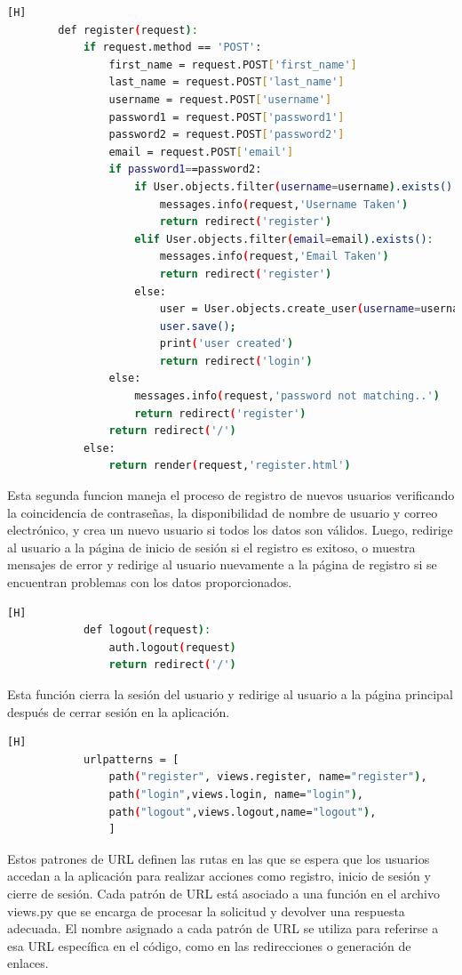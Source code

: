 \documentclass{article}
\begin{document}
	\begin{lstlisting}[language=bash,caption={Segunda funcion de views.py}][H]
        def register(request):
            if request.method == 'POST':
                first_name = request.POST['first_name']
                last_name = request.POST['last_name']
                username = request.POST['username']
                password1 = request.POST['password1']
                password2 = request.POST['password2']
                email = request.POST['email']
                if password1==password2:
                    if User.objects.filter(username=username).exists():
                        messages.info(request,'Username Taken')
                        return redirect('register')
                    elif User.objects.filter(email=email).exists():
                        messages.info(request,'Email Taken')
                        return redirect('register')
                    else:   
                        user = User.objects.create_user(username=username, password=password1, email=email,first_name=first_name,last_name=last_name)
                        user.save();
                        print('user created')
                        return redirect('login')
                else:
                    messages.info(request,'password not matching..')    
                    return redirect('register')
                return redirect('/')
            else:
                return render(request,'register.html')
	\end{lstlisting}
        Esta segunda funcion maneja el proceso de registro de nuevos usuarios verificando la coincidencia de contraseñas, la disponibilidad de nombre de usuario y correo electrónico, y crea un nuevo usuario si todos los datos son válidos. Luego, redirige al usuario a la página de inicio de sesión si el registro es exitoso, o muestra mensajes de error y redirige al usuario nuevamente a la página de registro si se encuentran problemas con los datos proporcionados.
        \begin{lstlisting}[language=bash,caption={Tercera funcion de views.py}][H]
            def logout(request):
                auth.logout(request)
                return redirect('/')  
	\end{lstlisting}
        Esta función cierra la sesión del usuario y redirige al usuario a la página principal después de cerrar sesión en la aplicación.

        \begin{lstlisting}[language=bash,caption={urls.py}][H]
            urlpatterns = [
                path("register", views.register, name="register"),
                path("login",views.login, name="login"),
                path("logout",views.logout,name="logout"),
                ]
	\end{lstlisting}
        Estos patrones de URL definen las rutas en las que se espera que los usuarios accedan a la aplicación para realizar acciones como registro, inicio de sesión y cierre de sesión. Cada patrón de URL está asociado a una función en el archivo views.py que se encarga de procesar la solicitud y devolver una respuesta adecuada. El nombre asignado a cada patrón de URL se utiliza para referirse a esa URL específica en el código, como en las redirecciones o generación de enlaces.
    
\end{document}
